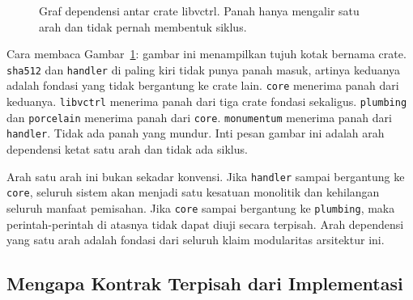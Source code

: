 \documentclass[11pt,a4paper]{article}
\begin{document}
\begin{figure}[H]
	\centering
	\caption{Graf dependensi antar crate libvctrl. Panah hanya mengalir satu arah dan tidak pernah membentuk siklus.}
	\label{fig:deps}
\end{figure}

Cara membaca Gambar~\ref{fig:deps}: gambar ini menampilkan tujuh kotak bernama crate. \texttt{sha512} dan \texttt{handler} di paling kiri tidak punya panah masuk, artinya keduanya adalah fondasi yang tidak bergantung ke crate lain. \texttt{core} menerima panah dari keduanya. \texttt{libvctrl} menerima panah dari tiga crate fondasi sekaligus. \texttt{plumbing} dan \texttt{porcelain} menerima panah dari \texttt{core}. \texttt{monumentum} menerima panah dari \texttt{handler}. Tidak ada panah yang mundur. Inti pesan gambar ini adalah arah dependensi ketat satu arah dan tidak ada siklus.

Arah satu arah ini bukan sekadar konvensi. Jika \texttt{handler} sampai bergantung ke \texttt{core}, seluruh sistem akan menjadi satu kesatuan monolitik dan kehilangan seluruh manfaat pemisahan. Jika \texttt{core} sampai bergantung ke \texttt{plumbing}, maka perintah-perintah di atasnya tidak dapat diuji secara terpisah. Arah dependensi yang satu arah adalah fondasi dari seluruh klaim modularitas arsitektur ini.

\subsection{Mengapa Kontrak Terpisah dari Implementasi}
\end{document}
